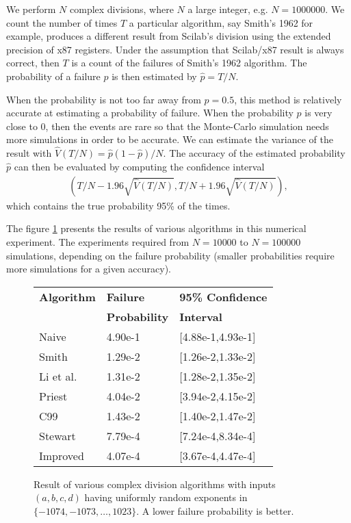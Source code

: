 \documentclass{paper}
\begin{document}
We perform $N$ complex divisions, where $N$ a large integer, e.g. $N=1 000 000$. 
We count the number of times $T$ a particular algorithm, say Smith's 1962 for example, 
produces a different result from Scilab's division using the extended precision of 
x87 registers. 
Under the assumption that Scilab/x87 result is always correct, 
then $T$ is a count of the failures of Smith's 1962 algorithm. 
The probability of a failure $p$ is then estimated by $\hat{p}=T/N$. 

When the probability is not too far away from $p=0.5$, this 
method is relatively accurate at estimating a probability of failure. 
When the probability $p$ is very close to 0, then the events are 
rare so that the Monte-Carlo simulation needs more simulations in order 
to be accurate. 
We can estimate the variance of the result with
$\hat{V}(T/N) = \hat{p}(1-\hat{p})/N$.
The accuracy of the estimated probability $\hat{p}$ can then be evaluated 
by computing the confidence interval
\begin{eqnarray}
\left(T/N-1.96\sqrt{\hat{V}(T/N)} , T/N + 1.96\sqrt{\hat{V}(T/N)}\right),
\end{eqnarray}
which contains the true probability 95\% of the times.

The figure \ref{fig-compdiv-varalgos} presents the results of 
various algorithms in this numerical experiment. 
The experiments required from $N = 10 000$ to 
$N = 100 000$ simulations, depending on the failure 
probability (smaller probabilities require more simulations for a 
given accuracy).

\begin{figure}
\caption{
Result of various complex division algorithms with 
inputs $(a,b,c,d)$ having uniformly random exponents in $\{-1074,-1073,\ldots,1023\}$. 
A lower failure probability is better. 
}
\label{fig-compdiv-varalgos}
\begin{center}
\begin{tabular}{l|l|l}
\bf{Algorithm} & \bf{Failure    } & \bf{95\% Confidence}\\
\bf{         } & \bf{Probability} & \bf{Interval} \\
\hline
Naive    & 4.90e-1 & [4.88e-1,4.93e-1] \\
Smith    & 1.29e-2 & [1.26e-2,1.33e-2] \\
Li et al.& 1.31e-2 & [1.28e-2,1.35e-2] \\
Priest   & 4.04e-2 & [3.94e-2,4.15e-2] \\
C99      & 1.43e-2 & [1.40e-2,1.47e-2] \\
Stewart  & 7.79e-4 & [7.24e-4,8.34e-4] \\
Improved & 4.07e-4 & [3.67e-4,4.47e-4] \\
\end{tabular}
\end{center}
\end{figure}
\end{document}
